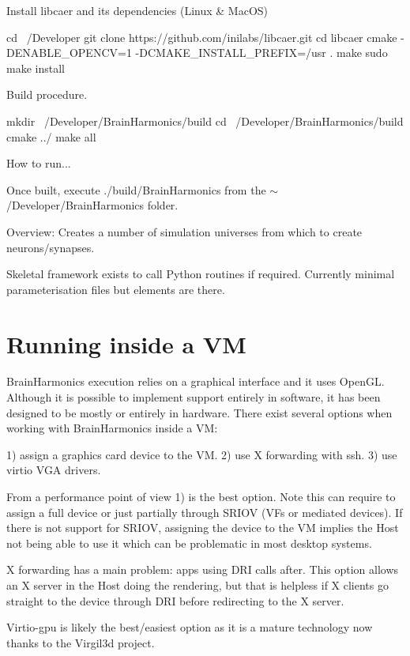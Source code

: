 Install libcaer and its dependencies (Linux \& Mac\+OS)


\begin{DoxyCode}
cd ~/Developer
git clone https://github.com/inilabs/libcaer.git
cd libcaer
cmake -DENABLE\_OPENCV=1 -DCMAKE\_INSTALL\_PREFIX=/usr .
make
sudo make install
\end{DoxyCode}


Build procedure.


\begin{DoxyCode}
mkdir ~/Developer/BrainHarmonics/build
cd ~/Developer/BrainHarmonics/build
cmake ../
make all
\end{DoxyCode}


How to run...

Once built, execute ./build/\+Brain\+Harmonics from the $\sim$/\+Developer/\+Brain\+Harmonics folder.

Overview\+: Creates a number of simulation universes from which to create neurons/synapses.

Skeletal framework exists to call Python routines if required. Currently minimal parameterisation files but elements are there.

\section*{Running inside a VM }

Brain\+Harmonics execution relies on a graphical interface and it uses Open\+GL. Although it is possible to implement support entirely in software, it has been designed to be mostly or entirely in hardware. There exist several options when working with Brain\+Harmonics inside a VM\+:

1) assign a graphics card device to the VM. 2) use X forwarding with ssh. 3) use virtio V\+GA drivers.

From a performance point of view 1) is the best option. Note this can require to assign a full device or just partially through S\+R\+I\+OV (V\+Fs or mediated devices). If there is not support for S\+R\+I\+OV, assigning the device to the VM implies the Host not being able to use it which can be problematic in most desktop systems.

X forwarding has a main problem\+: apps using D\+RI calls after. This option allows an X server in the Host doing the rendering, but that is helpless if X clients go straight to the device through D\+RI before redirecting to the X server.

Virtio-\/gpu is likely the best/easiest option as it is a mature technology now thanks to the Virgil3d project.

